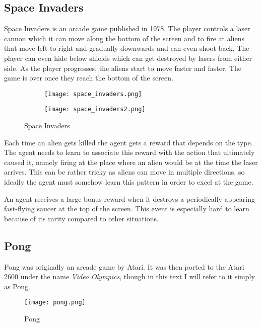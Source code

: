\subsection{Space Invaders}
\label{sub:space_invaders}
Space Invaders is an arcade game published in 1978.
The player controls a laser cannon
which it can move along the bottom of the screen
and to fire at aliens that move left to right and gradually downwards
and can even shoot back.
The player can even hide below shields
which can get destroyed by lasers from either side.
As the player progresses,
the aliens start to move faster and faster.
The game is over
once they reach the bottom of the screen.

\begin{figure}[htpb]
  \centering
  \begin{subfigure}[t]{.49\textwidth}
    \texttt{[image: space\_invaders.png]}
  \end{subfigure}
  \begin{subfigure}[t]{.49\textwidth}
    \texttt{[image: space\_invaders2.png]}
  \end{subfigure}
  \caption{Space Invaders}
  \label{fig:space_invaders}
\end{figure}

Each time an alien gets killed the agent gets a reward
that depends on the type.
The agent needs to learn to associate this reward
with the action that ultimately caused it,
namely firing at the place where an alien would be
at the time the laser arrives.
This can be rather tricky as aliens
can move in multiple directions,
so ideally the agent must somehow learn this pattern
in order to excel at the game.

An agent receives a large bonus reward
when it destroys a periodically appearing fast-flying saucer
at the top of the screen.
This event is especially hard to learn because
of its rarity compared to other situations.


\subsection{Pong}
\label{sub:pong}
Pong was originally an arcade game by Atari.
It was then ported to the Atari 2600
under the name \textit{Video Olympics},
though in this text I will refer to it simply as Pong.

\begin{figure}[htpb]
  \centering
  \texttt{[image: pong.png]}
  \caption{Pong}
  \label{fig:pong}
\end{figure}

